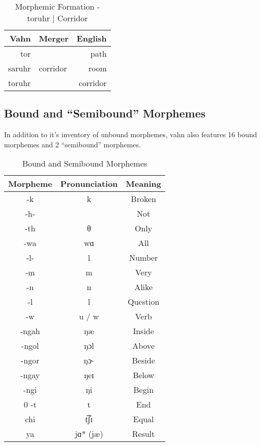 \documentclass{article}
\begin{document}
\begin{table}[H]
    \centering
    \begin{tabular}{r|l||r}
        Vahn     & Merger & English  \\
        \hline\hline
        tor &       &  path\\
        saruhr & corridor & room \\
        \hline \hline
        toruhr &        & corridor\\
    \end{tabular}
    \caption{Morphemic Formation - toruhr | Corridor}
    \label{Morphemic Formation - toruhr | Corridor}
\end{table}

\subsection{Bound and ``Semibound'' Morphemes}

In addition to it's inventory of unbound morphemes, vahn also features 16 bound morphemes and 2
``semibound'' morphemes.


\begin{table}[H]
    \centering
    \begin{tabular}{c|c|c}
        Morpheme & Pronunciation & Meaning \\
        \hline
        -k & k & Broken \\
        -h- & & Not \\
        -th & θ & Only \\
        -wa & wɑ & All \\
        -l- & l & Number \\
        -m & m & Very \\
        -n & n & Alike \\
        -l & l & Question \\
        -w & u / w & Verb \\
        -ngah &  ŋæ & Inside \\
        -ngol & ŋɔl & Above \\
        -ngor & ŋɔ˞& Beside \\
        -ngay & ŋeɪ & Below \\
        -ngi & ŋi & Begin \\0
        -t & t & End \\
        chi & t͡ʃɪ & Equal \\
        ya & jɑ* (jæ) & Result
    \end{tabular}
    \caption{Bound and Semibound Morphemes}
    \label{Bound and Semibound Morphemes}
\end{table}
\end{document}
